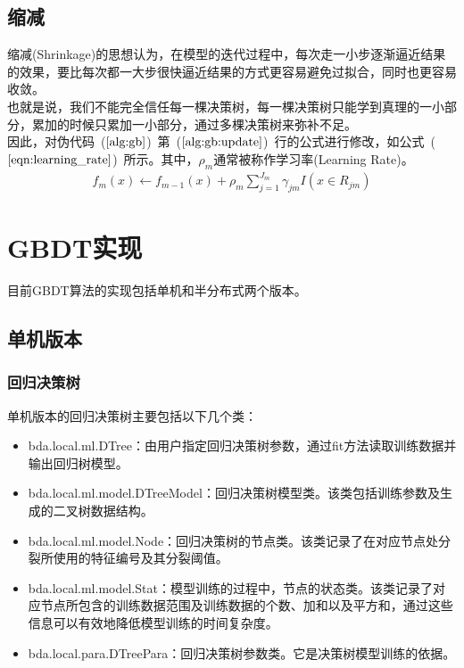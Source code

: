 \documentclass[a4paper,11pt,         %
               ]{article}
\begin{document}
\subsection{缩减}

缩减(Shrinkage)的思想认为，在模型的迭代过程中，每次走一小步逐渐逼近结果的效果，要比每次都一大步很快逼近结果的方式更容易避免过拟合，同时也更容易收敛。 \\

也就是说，我们不能完全信任每一棵决策树，每一棵决策树只能学到真理的一小部分，累加的时候只累加一小部分，通过多棵决策树来弥补不足。 \\

因此，对伪代码~($\ref{alg:gb}$)~第~($\ref{alg:gb:update}$)~行的公式进行修改，如公式~($\ref{eqn:learning_rate}$)~所示。其中，$\rho_{m}$通常被称作学习率(Learning Rate)。
\begin{eqnarray}
	\label{eqn:learning_rate}
	f_{m}\left ( x \right ) \gets f_{m-1}\left ( x \right ) + \rho_{m} \sum_{j=1}^{J_{m}} \gamma_{jm}I\left ( x \in R_{jm} \right )
\end{eqnarray}


\section{GBDT实现}

目前GBDT算法的实现包括单机和半分布式两个版本。

\subsection{单机版本}

\subsubsection{回归决策树}

单机版本的回归决策树主要包括以下几个类：
\begin{itemize}
	\item bda.local.ml.DTree：由用户指定回归决策树参数，通过fit方法读取训练数据并输出回归树模型。
	\item bda.local.ml.model.DTreeModel：回归决策树模型类。该类包括训练参数及生成的二叉树数据结构。
	\item bda.local.ml.model.Node：回归决策树的节点类。该类记录了在对应节点处分裂所使用的特征编号及其分裂阈值。
	\item bda.local.ml.model.Stat：模型训练的过程中，节点的状态类。该类记录了对应节点所包含的训练数据范围及训练数据的个数、加和以及平方和，通过这些信息可以有效地降低模型训练的时间复杂度。
	\item bda.local.para.DTreePara：回归决策树参数类。它是决策树模型训练的依据。
\end{itemize}
\end{document}
